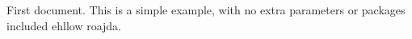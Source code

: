 \documentclass{article}
\begin{document}
First document. This is a simple example, with no 
extra parameters or packages included ehllow roajda.
\end{document}
